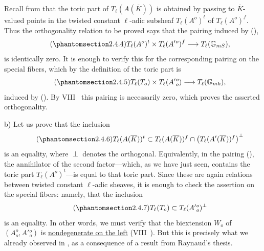 Recall from  that the toric part of
$T_\ell(A(\overline K))$ is obtained by passing to
$\overline K$-valued points in the twisted constant $\ell$-adic
subsheaf $T_\ell(A^o)^t$ of $T_\ell(A^o)^f$.  Thus the orthogonality
relation to be proved says that the pairing induced by (),
\begin{equation}\tag{\SGARefTarget{sga7.sga7i.eix.n2-4-4}{2.4.4}}
 T_\ell(A^o)^t\times T_\ell(A'{}^o)^f
 \longrightarrow T_\ell(\mathbb G_{mS}),
\end{equation}
is identically zero.  It is enough to verify this for the corresponding
pairing on the special fibers, which by the definition of the toric
part is
\begin{equation}\tag{\SGARefTarget{sga7.sga7i.eix.n2-4-5}{2.4.5}}
 T_\ell(T_o)\times T_\ell(A'{}_o^o)
 \longrightarrow T_\ell(\mathbb G_{mk}),
\end{equation}
induced by ().  By VIII~ this pairing is necessarily zero,
which proves the asserted orthogonality.

\smallskip
\noindent
b) Let us prove that the inclusion
\begin{equation}\tag{\SGARefTarget{sga7.sga7i.eix.n2-4-6}{2.4.6}}
 T_\ell(A(\overline K))^t\subset
 T_\ell(A(\overline K))^f\cap
 \bigl(T_\ell(A'(\overline K))^f\bigr)^\perp
\end{equation}
is an equality, where $\perp$ denotes the orthogonal.  Equivalently, in
the pairing (), the annihilator of the second factor---which, as
we have just seen, contains the toric part $T_\ell(A^o)^t$---is equal
to that toric part.  Since these are again relations between twisted
constant $\ell$-adic sheaves, it is enough to check the assertion on
the special fibers: namely, that the inclusion
\begin{equation}\tag{\SGARefTarget{sga7.sga7i.eix.n2-4-7}{2.4.7}}
 T_\ell(T_o)\subset T_\ell(A'{}_o^o)^\perp
\end{equation}
is an equality.  In other words, we must verify that the biextension
$W_o$ of $(A_o^o,A'{}_o^o)$ is \underline{nondegenerate on the left}
(VIII~).  But this is precisely what we already observed in ,
as a consequence of a result from Raynaud's thesis.
